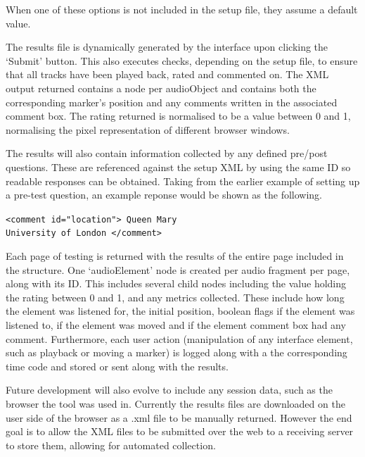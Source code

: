 \documentclass{article}
\begin{document}
When one of these options is not included in the setup file, they assume a default value. 


The results file is dynamically generated by the interface upon clicking the `Submit' button. This also executes checks, depending on the setup file, to ensure that all tracks have been played back, rated and commented on. The XML output returned contains a node per audioObject and contains both the corresponding marker's position and any comments written in the associated comment box. The rating returned is normalised to be a value between 0 and 1, normalising the pixel representation of different browser windows.

The results will also contain information collected by any defined pre/post questions. These are referenced against the setup XML by using the same ID so readable responses can be obtained. Taking from the earlier example of setting up a pre-test question, an example reponse would be shown as the following.

\texttt{<comment id="location"> Queen Mary \\University of London </comment>}

Each page of testing is returned with the results of the entire page included in the structure. One `audioElement' node is created per audio fragment per page, along with its ID. This includes several child nodes including the value holding the rating between 0 and 1, and any metrics collected. These include how long the element was listened for, the initial position, boolean flags if the element was listened to, if the element was moved and if the element comment box had any comment. Furthermore, each user action (manipulation of any interface element, such as playback or moving a marker) is logged along with a the corresponding time code and stored or sent along with the results.

Future development will also evolve to include any session data, such as the browser the tool was used in. Currently the results files are downloaded on the user side of the browser as a .xml file to be manually returned. However the end goal is to allow the XML files to be submitted over the web to a receiving server to store them, allowing for automated collection.


\end{document}
